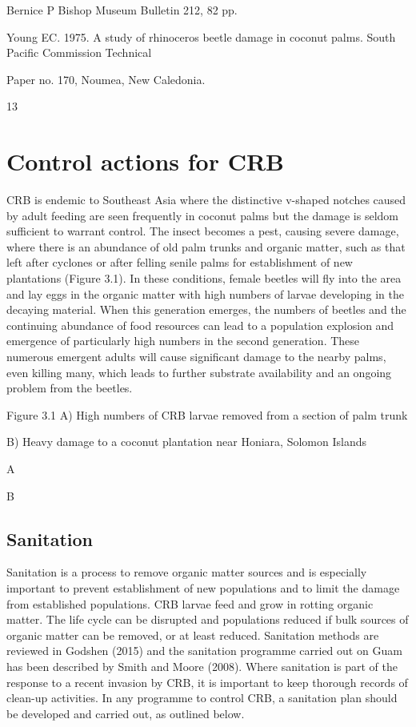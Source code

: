 \documentclass[twocolumn,letterpaper]{scrartcl}
\begin{document}
Bernice P Bishop Museum Bulletin 212, 82 pp.

Young EC. 1975. A study of rhinoceros beetle damage in coconut palms. South Pacific Commission Technical 

Paper no. 170, Noumea, New Caledonia. 

13

\section{Control actions for CRB}

CRB is endemic to Southeast Asia where the distinctive v-shaped notches caused by adult feeding are seen 
frequently in coconut palms but the damage is seldom sufficient to warrant control. The insect becomes a pest, 
causing severe damage, where there is an abundance of old palm trunks and organic matter, such as that left 
after cyclones or after felling senile palms for establishment of new plantations (Figure 3.1). In these conditions, 
female beetles will fly into the area and lay eggs in the organic matter with high numbers of larvae developing 
in the decaying material. When this generation emerges, the numbers of beetles and the continuing abundance 
of food resources can lead to a population explosion and emergence of particularly high numbers in the second 
generation. These numerous emergent adults will cause significant damage to the nearby palms, even killing 
many, which leads to further substrate availability and an ongoing problem from the beetles. 

 

Figure 3.1  A) High numbers of CRB larvae removed from a section of palm trunk   

            B) Heavy damage to a coconut plantation near Honiara, Solomon Islands

A

B

\subsection{Sanitation}

Sanitation is a process to remove organic matter sources and is especially important to prevent establishment 
of new populations and to limit the damage from established populations. CRB larvae feed and grow in rotting 
organic  matter.  The  life  cycle  can  be  disrupted  and  populations  reduced  if  bulk  sources  of  organic  matter 
can be removed, or at least reduced. Sanitation methods are reviewed in Godshen (2015) and the sanitation 
programme carried out on Guam has been described by Smith and Moore (2008). Where sanitation is part of 
the response to a recent invasion by CRB, it is important to keep thorough records of clean-up activities. In any 
programme to control CRB, a sanitation plan should be developed and carried out, as outlined below.
\end{document}
